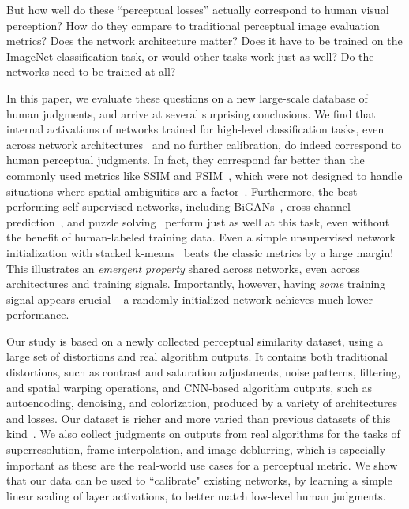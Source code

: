 But how well do these ``perceptual losses'' actually correspond to human visual perception? How do they compare to traditional perceptual image evaluation metrics? Does the network architecture matter? Does it have to be trained on the ImageNet classification task, or would other tasks work just as well?  Do the networks need to be trained at all?



In this paper, we evaluate these questions on a new large-scale database of human judgments, and arrive at several surprising conclusions. We find that internal activations of networks trained for high-level classification tasks, even across network architectures~\cite{iandola2016squeezenet,krizhevsky2012imagenet,simonyan2014very} and no further calibration, do indeed correspond to human perceptual judgments. In fact, they correspond far better than the commonly used metrics like SSIM and FSIM~\cite{wang2004image, zhang2011fsim}, which were not designed to handle situations where spatial ambiguities are a factor~\cite{sampat2009complex}. Furthermore, the best performing self-supervised networks, including BiGANs~\cite{donahue2016adversarial}, cross-channel prediction~\cite{zhang2017split}, and puzzle solving~\cite{noroozi2016unsupervised} perform just as well at this task, even without the benefit of human-labeled training data. Even a simple unsupervised network initialization with stacked k-means~\cite{krahenbuhl2015data} beats the classic metrics by a large margin! 
This illustrates an \textit{emergent property} shared across networks, even across architectures and training signals. Importantly, however, having \textit{some} training signal appears crucial -- a randomly initialized network achieves much lower performance.

Our study is based on a newly collected perceptual similarity dataset, using a large set of distortions and real algorithm outputs. It contains both traditional distortions, such as contrast and saturation adjustments, noise patterns, filtering, and spatial warping operations, and CNN-based algorithm outputs, such as autoencoding, denoising, and colorization, produced by a variety of architectures and losses. Our dataset is richer and more varied than previous datasets of this kind~\cite{ponomarenko2015image}. We also collect judgments on outputs from real algorithms for the tasks of superresolution, frame interpolation, and image deblurring, which is especially important as these are the real-world use cases for a perceptual metric.
We show that our data can be used to ``calibrate" existing networks, by learning a simple linear scaling of layer activations, to better match low-level human judgments.

